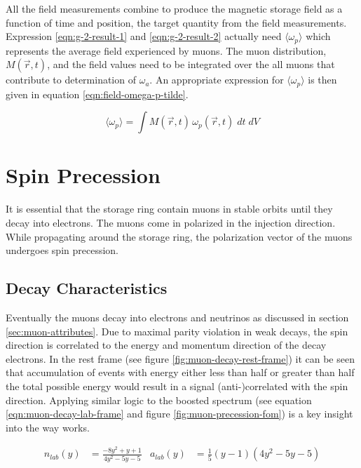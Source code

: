 All the field measurements combine to produce the magnetic storage field as a function of time and position, the target quantity from the field measurements.  Expression \ref{eqn:g-2-result-1} and \ref{eqn:g-2-result-2} actually need $\langle \omega_p \rangle$ which represents the average field experienced by muons.  The muon distribution, $M(\vec{r}, t)$, and the field values need to be integrated over the all muons that contribute to determination of $\omega_a$.  An appropriate expression for $\langle \omega_p \rangle$ is then given in equation \ref{eqn:field-omega-p-tilde}.

\begin{equation}
\label{eqn:field-omega-p-tilde}
\langle \omega_p \rangle = \int M(\vec{r}, t) \, \omega_p(\vec{r}, t)\; dt\;dV
\end{equation}

\section{Spin Precession} \label{sec:spin-precession}

It is essential that the storage ring contain muons in stable orbits until they decay into electrons.  The muons come in polarized in the injection direction.  While propagating around the storage ring, the polarization vector of the muons undergoes spin precession.

\subsection{Decay Characteristics}

Eventually the muons decay into electrons and neutrinos as discussed in section \ref{sec:muon-attributes}. Due to maximal parity violation in weak decays, the spin direction is correlated to the energy and momentum direction of the decay electrons.  In the rest frame (see figure \ref{fig:muon-decay-rest-frame}) it can be seen that accumulation of events with energy either less than half or greater than half the total possible energy would result in a signal (anti-)correlated with the spin direction.  Applying similar logic to the boosted spectrum (see equation \ref{eqn:muon-decay-lab-frame} and figure \ref{fig:muon-precession-fom}) is a key insight into the way \gmtwo works.

\begin{align}
\label{eqn:muon-decay-lab-frame}
n_{lab}(y) & = \frac{-8 y^2 + y + 1}{4 y^2 - 5y - 5} & a_{lab}(y) & = \tfrac{1}{5}(y - 1) (4 y^2 - 5y - 5)
\end{align}

